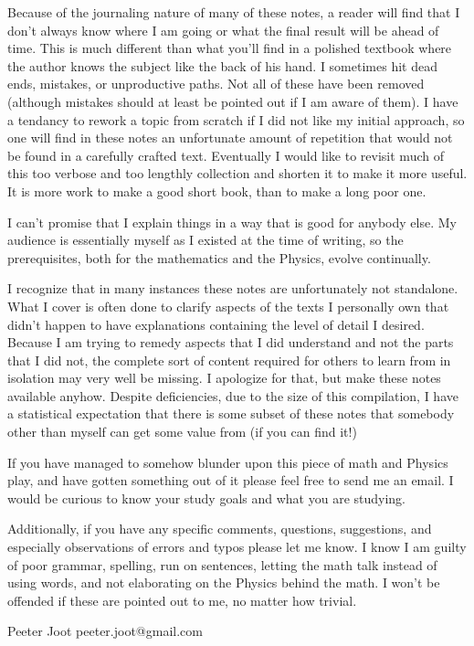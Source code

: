 Because of the journaling nature of many of these notes, a reader will find that I don't always know where I am going or what the final result will be ahead of time.  This is much different than what you'll find in a polished textbook where the author knows the subject like the back of his hand.  I sometimes hit dead ends, mistakes, or unproductive paths.  Not all of these have been removed (although mistakes should at least be pointed out if I am aware of them).  I have a tendancy to rework a topic from scratch if I did not like my initial approach, so one will find in these notes an unfortunate amount of repetition that would not be found in a carefully crafted text.  Eventually I would like to revisit much of this too verbose and too lengthly collection and shorten it to make it more useful.  It is more work to make a good short book, than to make a long poor one.

I can't promise that I explain things in a way that is good for anybody else.  My audience is essentially myself as I existed at the time of writing, so the prerequisites, both for the mathematics and the Physics, evolve continually. 

I recognize that in many instances these notes are unfortunately not standalone.  What I cover is often done to clarify aspects of the texts I personally own that didn't happen to have explanations containing the level of detail I desired.  Because I am trying to remedy aspects that I did understand and not the parts that I did not, the complete sort of content required for others to learn from in isolation may very well be missing.  I apologize for that, but make these notes available anyhow.  Despite deficiencies, due to the size of this compilation, I have a statistical expectation that there is some subset of these notes that somebody other than myself can get some value from (if you can find it!)

If you have managed to somehow blunder upon this piece of math and Physics play, and have gotten something out of it please feel free to send me an email.  I would be curious to know your study goals and what you are studying.

Additionally, if you have any specific comments, questions, suggestions, and especially observations of errors and typos please let me know.  I know I am guilty of poor grammar, spelling, run on sentences, letting the math talk instead of using words, and not elaborating on the Physics behind the math.  I won't be offended if these are pointed out to me, no matter how trivial.

Peeter Joot  \quad peeter.joot@gmail.com 
